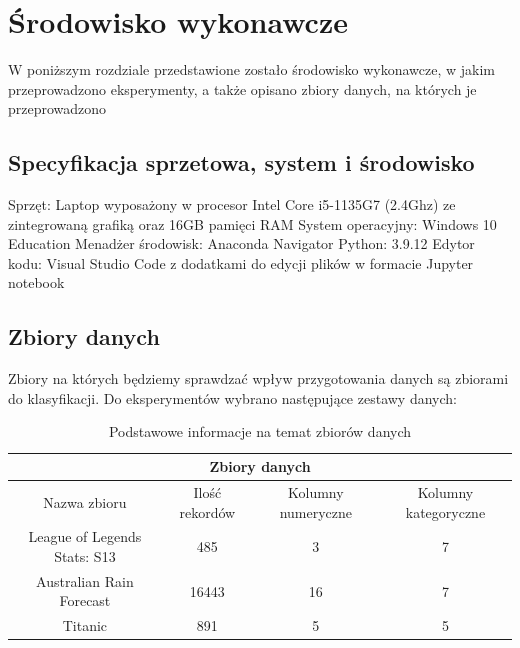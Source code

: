 \documentclass{book}
\begin{document}
\chapter{Środowisko wykonawcze}

W poniższym rozdziale przedstawione zostało środowisko wykonawcze, 
w jakim przeprowadzono eksperymenty, a także opisano zbiory danych, 
na których je przeprowadzono
\section{Specyfikacja sprzetowa, system i środowisko}
Sprzęt: Laptop wyposażony w procesor Intel Core i5-1135G7 
(2.4Ghz) ze zintegrowaną grafiką oraz 16GB pamięci RAM
System operacyjny: Windows 10 Education
Menadżer środowisk: Anaconda Navigator
Python: 3.9.12
Edytor kodu: Visual Studio Code z dodatkami do edycji plików w 
formacie Jupyter notebook
\section{Zbiory danych}
Zbiory na których będziemy sprawdzać wpływ przygotowania danych 
są zbiorami do klasyfikacji. Do eksperymentów wybrano następujące 
zestawy danych:

\begin{center}
    \begin{table}[H]
    \begin{tabular}{ |c|c|c|c| } 
    \hline
    \multicolumn{4}{|c|}{Zbiory danych} \\
    \hline
    Nazwa zbioru & Ilość rekordów & Kolumny numeryczne & Kolumny kategoryczne \\
     \hline
     League of Legends Stats: S13\cite{lol_stats_dataset} & 485 & 3 & 7\\ 
     Australian Rain Forecast\cite{australian_rain_dataset} & 16443 & 16 & 7\\ 
     Titanic\cite{titanic_dataset} & 891 & 5 & 5\\ 
     \hline
     
    \end{tabular}
    \caption{Podstawowe informacje na temat zbiorów danych}
\end{table}
    \end{center}
\end{document}

